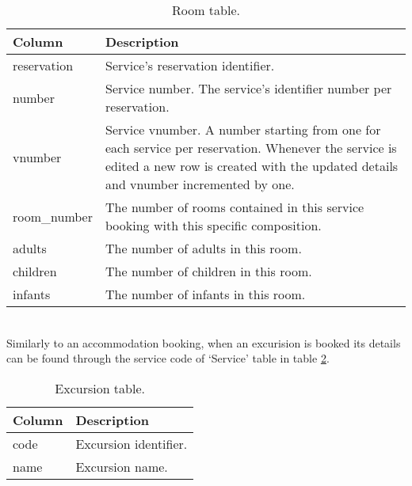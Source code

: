 \begin{table}[ht]
\begin{center}
\begin{tabular}{l | p{12cm}}
\textcolor{theme}{\textbf{Column}} & \textcolor{theme}{\textbf{Description}}\\
\hline
reservation & Service's reservation identifier.\\
\hline
number & Service number. The service's identifier number per reservation.\\
\hline
vnumber & Service vnumber. A number starting from one for each service per reservation. Whenever the service is edited a new row is created with the updated details and vnumber incremented by one.\\
\hline
room\_number & The number of rooms contained in this service booking with this specific composition.\\
\hline
adults & The number of adults in this room.\\
\hline
children & The number of children in this room.\\
\hline
infants & The number of infants in this room.\\
\hline
\end{tabular}
\caption{Room table.}
\label{tab:room}
\end{center}
\end{table}
\\
Similarly to an accommodation booking, when an excurision is booked its details can be found through the service code of `Service' table in table \ref{tab:excursion}. \\
\begin{table}[ht]
\begin{center}
\begin{tabular}{l | p{12cm}}
\textcolor{theme}{\textbf{Column}} & \textcolor{theme}{\textbf{Description}}\\
\hline
code & Excursion identifier.\\
\hline
name & Excursion name.\\
\hline
\end{tabular}
\caption{Excursion table.}
\label{tab:excursion}
\end{center}
\end{table}
